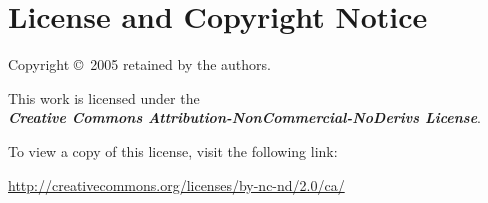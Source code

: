 \chapter*{\centering \huge License and Copyright Notice}

\begin{center}
Copyright \copyright\ 2005 retained by the authors.

\bigskip
\noindent This work is licensed under the \\
{\textbf{\textit{Creative Commons 
Attribution-NonCommercial-NoDerivs License}}}.

\bigskip 
\noindent To view a copy of this license, visit the following link:

\smallskip
\url{http://creativecommons.org/licenses/by-nc-nd/2.0/ca/}
\end{center}

